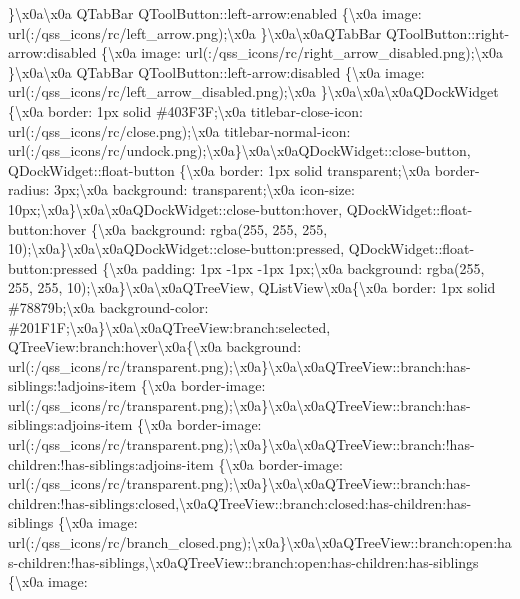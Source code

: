 \}\textbackslash{}x0a\textbackslash{}x0a Q\+Tab\+Bar Q\+Tool\+Button\+::left-\/arrow\+:enabled \{\textbackslash{}x0a image\+: url(\+:/qss\+\_\+icons/rc/left\+\_\+arrow.\+png);\textbackslash{}x0a \}\textbackslash{}x0a\textbackslash{}x0a\+Q\+Tab\+Bar Q\+Tool\+Button\+::right-\/arrow\+:disabled \{\textbackslash{}x0a image\+: url(\+:/qss\+\_\+icons/rc/right\+\_\+arrow\+\_\+disabled.\+png);\textbackslash{}x0a \}\textbackslash{}x0a\textbackslash{}x0a Q\+Tab\+Bar Q\+Tool\+Button\+::left-\/arrow\+:disabled \{\textbackslash{}x0a image\+: url(\+:/qss\+\_\+icons/rc/left\+\_\+arrow\+\_\+disabled.\+png);\textbackslash{}x0a \}\textbackslash{}x0a\textbackslash{}x0a\textbackslash{}x0a\+Q\+Dock\+Widget \{\textbackslash{}x0a border\+: 1px solid \#403\+F3\+F;\textbackslash{}x0a titlebar-\/close-\/icon\+: url(\+:/qss\+\_\+icons/rc/close.\+png);\textbackslash{}x0a titlebar-\/normal-\/icon\+: url(\+:/qss\+\_\+icons/rc/undock.\+png);\textbackslash{}x0a\}\textbackslash{}x0a\textbackslash{}x0a\+Q\+Dock\+Widget\+::close-\/button, Q\+Dock\+Widget\+::float-\/button \{\textbackslash{}x0a border\+: 1px solid transparent;\textbackslash{}x0a border-\/radius\+: 3px;\textbackslash{}x0a background\+: transparent;\textbackslash{}x0a icon-\/size\+: 10px;\textbackslash{}x0a\}\textbackslash{}x0a\textbackslash{}x0a\+Q\+Dock\+Widget\+::close-\/button\+:hover, Q\+Dock\+Widget\+::float-\/button\+:hover \{\textbackslash{}x0a background\+: rgba(255, 255, 255, 10);\textbackslash{}x0a\}\textbackslash{}x0a\textbackslash{}x0a\+Q\+Dock\+Widget\+::close-\/button\+:pressed, Q\+Dock\+Widget\+::float-\/button\+:pressed \{\textbackslash{}x0a padding\+: 1px -\/1px -\/1px 1px;\textbackslash{}x0a background\+: rgba(255, 255, 255, 10);\textbackslash{}x0a\}\textbackslash{}x0a\textbackslash{}x0a\+Q\+Tree\+View, Q\+List\+View\textbackslash{}x0a\{\textbackslash{}x0a border\+: 1px solid \#78879b;\textbackslash{}x0a background-\/color\+: \#201\+F1\+F;\textbackslash{}x0a\}\textbackslash{}x0a\textbackslash{}x0a\+Q\+Tree\+View\+:branch\+:selected, Q\+Tree\+View\+:branch\+:hover\textbackslash{}x0a\{\textbackslash{}x0a background\+: url(\+:/qss\+\_\+icons/rc/transparent.\+png);\textbackslash{}x0a\}\textbackslash{}x0a\textbackslash{}x0a\+Q\+Tree\+View\+::branch\+:has-\/siblings\+:!adjoins-\/item \{\textbackslash{}x0a border-\/image\+: url(\+:/qss\+\_\+icons/rc/transparent.\+png);\textbackslash{}x0a\}\textbackslash{}x0a\textbackslash{}x0a\+Q\+Tree\+View\+::branch\+:has-\/siblings\+:adjoins-\/item \{\textbackslash{}x0a border-\/image\+: url(\+:/qss\+\_\+icons/rc/transparent.\+png);\textbackslash{}x0a\}\textbackslash{}x0a\textbackslash{}x0a\+Q\+Tree\+View\+::branch\+:!has-\/children\+:!has-\/siblings\+:adjoins-\/item \{\textbackslash{}x0a border-\/image\+: url(\+:/qss\+\_\+icons/rc/transparent.\+png);\textbackslash{}x0a\}\textbackslash{}x0a\textbackslash{}x0a\+Q\+Tree\+View\+::branch\+:has-\/children\+:!has-\/siblings\+:closed,\textbackslash{}x0a\+Q\+Tree\+View\+::branch\+:closed\+:has-\/children\+:has-\/siblings \{\textbackslash{}x0a image\+: url(\+:/qss\+\_\+icons/rc/branch\+\_\+closed.\+png);\textbackslash{}x0a\}\textbackslash{}x0a\textbackslash{}x0a\+Q\+Tree\+View\+::branch\+:open\+:has-\/children\+:!has-\/siblings,\textbackslash{}x0a\+Q\+Tree\+View\+::branch\+:open\+:has-\/children\+:has-\/siblings \{\textbackslash{}x0a image\+: 